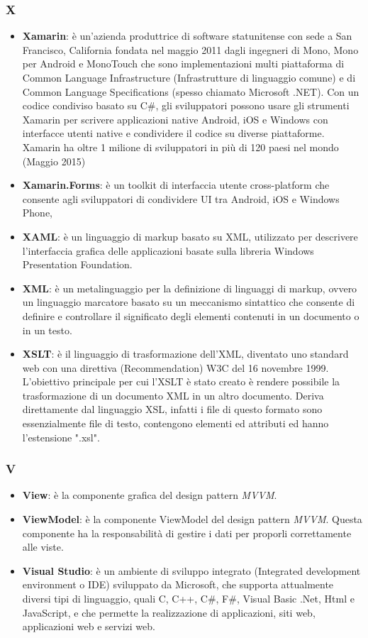 \subsubsection{X}
\begin{itemize}
	\item \textbf{Xamarin}:  è un'azienda produttrice di software statunitense con sede a San Francisco, California fondata nel maggio 2011 dagli ingegneri di Mono, Mono per Android e MonoTouch che sono implementazioni multi piattaforma di Common Language Infrastructure (Infrastrutture di linguaggio comune) e di Common Language Specifications (spesso chiamato Microsoft .NET). Con un codice condiviso basato su C\#, gli sviluppatori possono usare gli strumenti Xamarin per scrivere applicazioni native Android, iOS e Windows con interfacce utenti native e condividere il codice su diverse piattaforme. Xamarin ha oltre 1 milione di sviluppatori in più di 120 paesi nel mondo (Maggio 2015)
	\item \textbf{Xamarin.Forms}: è un toolkit di interfaccia utente cross-platform che consente agli sviluppatori di condividere UI tra Android, iOS e Windows Phone, 
	\item \textbf{XAML}:  è un linguaggio di markup basato su XML, utilizzato per descrivere l'interfaccia grafica delle applicazioni basate sulla libreria Windows Presentation Foundation.
	\item \textbf{XML}: è un metalinguaggio per la definizione di linguaggi di markup, ovvero un linguaggio marcatore basato su un meccanismo sintattico che consente di definire e controllare il significato degli elementi contenuti in un documento o in un testo.
	\item \textbf{XSLT}: è il linguaggio di trasformazione dell'XML, diventato uno standard web con una direttiva (Recommendation) W3C del 16 novembre 1999. L'obiettivo principale per cui l'XSLT è stato creato è rendere possibile la trasformazione di un documento XML in un altro documento. Deriva direttamente dal linguaggio XSL, infatti i file di questo formato sono essenzialmente file di testo, contengono elementi ed attributi ed hanno l'estensione ".xsl".
\end{itemize}

\subsubsection{V}
\begin{itemize}
	\item \textbf{View}: è la componente grafica del design pattern \textit{MVVM}.
	\item \textbf{ViewModel}: è la componente ViewModel del design pattern \textit{MVVM}. Questa componente ha la responsabilità di gestire i dati per proporli correttamente alle viste.
	\item \textbf{Visual Studio}: è un ambiente di sviluppo integrato (Integrated development environment o IDE) sviluppato da Microsoft, che supporta attualmente diversi tipi di linguaggio, quali C, C++, C\#, F\#, Visual Basic .Net, Html e JavaScript, e che permette la realizzazione di applicazioni, siti web, applicazioni web e servizi web.
\end{itemize}

